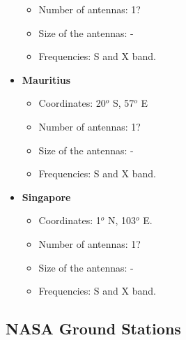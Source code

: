 \documentclass[12pt,a4paper]{report}
\begin{document}
\begin{itemize}
\begin{itemize}
\item Number of antennas: 1?
\item Size of the antennas: -
\item Frequencies: S and X band.
\end{itemize}
\item \textbf{Mauritius}
\begin{itemize}
\item Coordinates: 20$^{o}$ S, 57$^{o}$ E
\item Number of antennas: 1?
\item Size of the antennas: -
\item Frequencies: S and X band.
\end{itemize}
\item \textbf{Singapore}
\begin{itemize}
\item Coordinates: 1$^{o}$ N, 103$^{o}$ E.
\item Number of antennas: 1?
\item Size of the antennas: -
\item Frequencies: S and X band.
\end{itemize}
\end{itemize}

\subsection{NASA Ground Stations}
\end{document}
